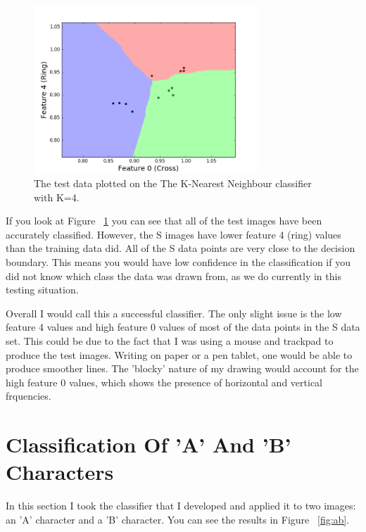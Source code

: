 \documentclass[11pt, a4paper]{article}
\begin{document}
\begin{figure}[ht]
	\centering
	\includegraphics[trim={0 0 0 1cm},clip,width=0.75\textwidth]{test_plot.png}
	\caption{The test data plotted on the The K-Nearest Neighbour classifier with K=4.}
	\label{fig:classifier_test}
\end{figure}

If you look at Figure ~\ref{fig:classifier_test} you can see that all of the test images have been accurately classified. However, the S images have lower feature 4 (ring) values than the training data did. All of the S data points are very close to the decision boundary. This means you would have low confidence in the classification if you did not know which class the data was drawn from, as we do currently in this testing situation. 

Overall I would call this a successful classifier. The only slight issue is the low feature 4 values and high feature 0 values of most of the data points in the S data set. This could be due to the fact that I was using a mouse and trackpad to produce the test images. Writing on paper or a pen tablet, one would be able to produce smoother lines. The 'blocky' nature of my drawing would account for the high feature 0 values, which shows the presence of horizontal and vertical frquencies. 

\section{Classification Of 'A' And 'B' Characters}

In this section I took the classifier that I developed and applied it to two images: an 'A' character and a 'B' character. You can see the results in Figure ~\ref{fig:ab}.
\end{document}
